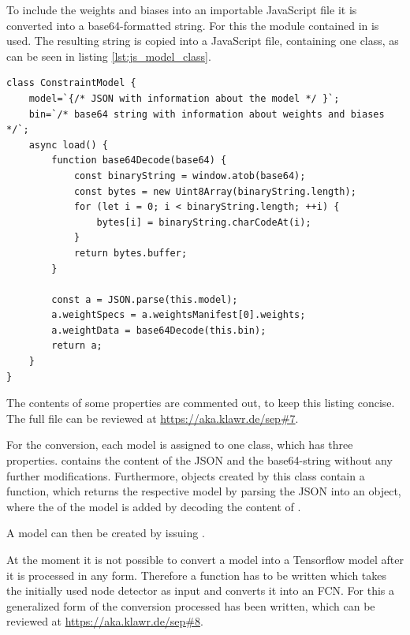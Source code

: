 To include the weights and biases into an importable JavaScript file it is converted into a base64-formatted string.
For this the  \cite{Josefsson2018} module contained in  is used.
The resulting string is copied into a JavaScript file, containing one class, as can be seen in listing \ref{lst:js_model_class}.

\begin{lstlisting}[label={lst:js_model_class}, caption={[JavaScript classes for Tensorflow.js.] Class definition of one of the models providing necessary functions to be used by \code{tf.loadLayersModel} to return a usable model in JavaScript. }]
class ConstraintModel {
    model=`{/* JSON with information about the model */ }`;
    bin=`/* base64 string with information about weights and biases */`;
    async load() {
        function base64Decode(base64) {
            const binaryString = window.atob(base64);
            const bytes = new Uint8Array(binaryString.length);
            for (let i = 0; i < binaryString.length; ++i) {
                bytes[i] = binaryString.charCodeAt(i);
            }
            return bytes.buffer;
        }
    
        const a = JSON.parse(this.model);
        a.weightSpecs = a.weightsManifest[0].weights;
        a.weightData = base64Decode(this.bin);
        return a;
    }
}
\end{lstlisting}

The contents of some properties are commented out, to keep this listing concise.
The full file can be reviewed at \url{https://aka.klawr.de/sep\#7}. %

For the conversion, each model is assigned to one class, which has three properties.
 contains the content of the JSON and  the base64-string without any further modifications.
Furthermore, objects created by this class contain a  function, which returns the respective model by parsing the JSON into an object, where the  of the model is added by decoding the content of .

A model can then be created by issuing .

At the moment it is not possible to convert a model into a Tensorflow model after it is processed in any form.
Therefore a function has to be written which takes the initially used node detector as input and converts it into an FCN.
For this a generalized form of the conversion processed has been written, which can be reviewed at \url{https://aka.klawr.de/sep\#8}. %


